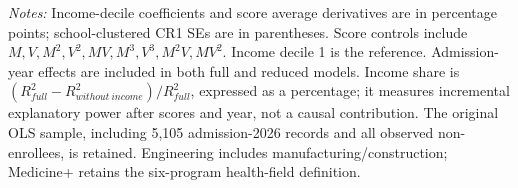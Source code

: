 \begin{table}[!htbp]
\begin{tabular}{lrrrr}
\hline\hline\end{tabular}
\begin{minipage}{0.98\textwidth}\footnotesize
\textit{Notes:} Income-decile coefficients and score average derivatives are in percentage points; school-clustered CR1 SEs are in parentheses. Score controls include $M,V,M^2,V^2,MV,M^3,V^3,M^2V,MV^2$. Income decile 1 is the reference. Admission-year effects are included in both full and reduced models. Income share is $(R^2_{full}-R^2_{without\ income})/R^2_{full}$, expressed as a percentage; it measures incremental explanatory power after scores and year, not a causal contribution. The original OLS sample, including 5,105 admission-2026 records and all observed non-enrollees, is retained. Engineering includes manufacturing/construction; Medicine+ retains the six-program health-field definition.
\end{minipage}
\end{table}
